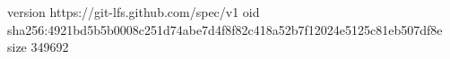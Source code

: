 version https://git-lfs.github.com/spec/v1
oid sha256:4921bd5b5b0008c251d74abe7d4f8f82c418a52b7f12024e5125c81eb507df8e
size 349692
